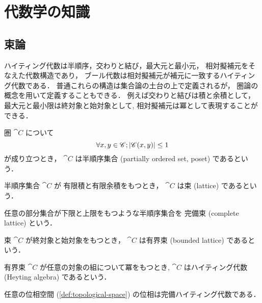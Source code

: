 \documentclass[titlepage]{ltjsreport}
\newtheorem[S]{theorem}{定理}[chapter]
\newtheorem[S]{definition}[theorem]{定義}
\newtheorem[S]{example}[theorem]{例}
\begin{document}
\chapter{代数学の知識}

\section{束論}

ハイティング代数は半順序，交わりと結び，最大元と最小元，
相対擬補元をそなえた代数構造であり，
ブール代数は相対擬補元が補元に一致するハイティング代数である．
普通これらの構造は集合論の土台の上で定義されるが，
圏論の概念を用いて定義することもできる．
例えば交わりと結びは積と余積として，最大元と最小限は終対象と始対象として,
相対擬補元は冪として表現することができる．

\begin{definition}[半順序集合]
  圏 $\cat{C}$ について
  \begin{equation}
    \forall x,y\in\mathscr{C};|\mathscr{C}(x,y)|\le1
  \end{equation}
  が成り立つとき，
  $\cat{C}$ は半順序集合 (partially ordered set, poset)
  であるという．
\end{definition}

\begin{definition}[束]
  半順序集合 $\cat{C}$ が
  有限積と有限余積をもつとき，
  $\cat{C}$ は束 (lattice) であるという．
\end{definition}

\begin{definition}[完備束]\label{def:complete-lattice}%
  任意の部分集合が下限と上限をもつような半順序集合を
  完備束
  (complete lattice)
  という．
\end{definition}

\begin{definition}[有界束]
  束 $\cat{C}$ が終対象と始対象をもつとき，
  $\cat{C}$ は有界束 (bounded lattice) であるという．
\end{definition}

\begin{definition}[ハイティング代数]\label{def:heyting-algebra}%
  有界束 $\cat{C}$ が任意の対象の組について冪をもつとき,
  $\cat{C}$ はハイティング代数 (Heyting algebra) であるという．
\end{definition}

\begin{theorem}
  任意の位相空間 (\cref{def:topological-space})
  の位相は完備ハイティング代数である．
\end{theorem}
\end{document}
